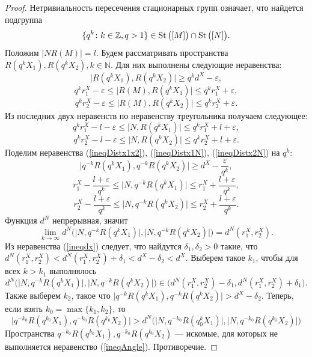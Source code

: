 \begin{proof}
  Нетривиальность пересечения стационарных групп означает, что найдется
  подгруппа \[
    \{q^k \colon k\in \mathbb{Z}, q> 1\} \in \operatorname{St}\big([M]\big) \cap \operatorname{St}
    \big([N]\big).
  \]
  Положим \( |N R(M)| = l \). Будем рассматривать пространства \(
  R(q^k X_1), R(q^k X_2), k \in \mathbb{N} \). Для них выполнены
  следующие неравенства:
  \begin{equation}
    \big| R(q^k X_1), R(q^k X_2) \big| \ge q^k d^X - \varepsilon,
    \label{ineqDistx1x2}
  \end{equation}
  \[
    q^k r_1^X - \varepsilon  \le\big | R(M), R(q^k X_1) \big| \le q^k
    r_1^X + \varepsilon ,
  \]
  \[
    q^k r_2^X - \varepsilon  \le\big | R(M), R(q^k X_2) \big| \le q^k
    r_2^X + \varepsilon .
  \]
  Из последних двух неравенств по неравенству треугольника получаем
  следующее:
  \begin{equation}
    q^k r_1^X - l - \varepsilon \le \big|N, R(q^k X_1) \big| \le
    q^k r_1^X + l + \varepsilon,\label{ineqDistx1N}
  \end{equation}
  \begin{equation}
    q^k r_2^X - l - \varepsilon \le \big|N, R(q^k X_2) \big| \le q^k
    r_2^X + l + \varepsilon.\label{ineqDistx2N}
  \end{equation}
  Поделим неравенства (\ref{ineqDistx1x2}), (\ref{ineqDistx1N}),
  (\ref{ineqDistx2N}) на \( q^k \):
  \[ \big| q^{-k}R(q^k X_1), q^{-k}R(q^k X_2) \big| \ge d^X -
  \frac{\varepsilon }{q^k}, \]
  \[
    r_1^X - \frac{l + \varepsilon}{q^k} \le \big|N, q^{-k}R(q^k X_1)
    \big| \le
    r_1^X + \frac{l + \varepsilon}{q^k},
  \]
  \[
    r_2^X - \frac{l + \varepsilon}{q^k} \le \big|N, q^{-k}R(q^k X_2)
    \big| \le
    r_2^X + \frac{l + \varepsilon}{q^k}.
  \]
  Функция \( d^N \) непрерывная, значит
  \[
    \lim_{k \rightarrow \infty
    }d^N\Big(\big|N, q^{-k}R(q^k X_1)
      \big|, \big|N, q^{-k}R(q^k X_2)
    \big|\Big) = d^N(r_1^X, r_2^X).
  \]
  Из неравенства (\ref{ineqdx}) следует, что найдутся \( \delta
    _1, \delta _2
  > 0 \) такие, что \( d^N(r_1^X,r_2^X)<d^N(r_1^X, r_2^X)+\delta
  _1 < d^X- \delta _2 < d^X \). Выберем такое \( k_1 \), чтобы
  для всех \( k > k_1 \) выполнялось
  \[
    d^N\Big(\big|N, q^{-k}R(q^k X_1)
      \big|, \big|N, q^{-k}R(q^k X_2)
    \big|\Big) \in \big(d^N(r_1^X, r_2^X)- \delta _1,
  d^N(r_1^X, r_2^X)+ \delta _1\big).  \]
  Также выберем \( k_2 \), такое что \( \big| q^{-k}R(q^k X_1),
  q^{-k}R(q^k X_2) \big| > d^X - \delta _2 \).
  Теперь, если взять \( k_0 = \max\{k_1,k_2\} \), то
  \[ \big| q^{-k_0}R(q^{k_0} X_1), q^{-k_0}R(q^{k_0} X_2) \big|
    > d^N\Big(\big|N, q^{-k_0}R(q^k_0 X_1) \big|, \big|N,
  q^{-k_0}R(q^{k_0} X_2) \big|\Big) \]
  Пространства \( q^{-k_0}R(q^{k_0}X_1), q^{-k_0}R(q^{k_0}X_2)\)
  ---
  искомые, для которых не выполняется неравенство (\ref{ineqAngle}).
  Противоречие.

\end{proof}
